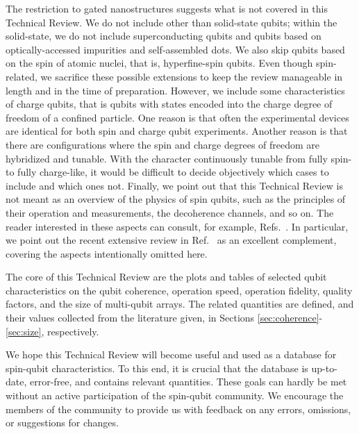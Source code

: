 \documentclass[aps, prx, showpacs, twocolumn, superscriptaddress, notitlepage, longbibliography, floatfix, nofootinbib]{revtex4-2}
\begin{document}
The restriction to gated nanostructures suggests what is not covered in this Technical Review. We do not include other than solid-state qubits; within the solid-state, we do not include superconducting qubits and qubits based on optically-accessed impurities and self-assembled dots. We also skip qubits based on the spin of atomic nuclei, that is, hyperfine-spin qubits. Even though spin-related, we sacrifice these possible extensions to keep the review manageable in length and in the time of preparation. However, we include some characteristics of charge qubits, that is qubits with states encoded into the charge degree of freedom of a confined particle. One reason is that often the experimental devices are identical for both spin and charge qubit experiments. Another reason is that there are configurations where the spin and charge degrees of freedom are hybridized and tunable. With the character continuously tunable from fully spin- to fully charge-like, it would be difficult to decide objectively which cases to include and which ones not. Finally, we point out that this Technical Review is not meant as an overview of the physics of spin qubits, such as the principles of their operation and measurements, the decoherence channels, and so on. The reader interested in these aspects can consult, for example, Refs.~\cite{oosterkamp_photon_1999, van_der_wiel_electron_2002, schliemann_electron_2003, hanson_spins_2007, kloeffel_prospects_2013, schreiber_quantum_2014, tahan_opinion_2021, chatterjee_semiconductor_2021, gonzalez-zalba_scaling_2021, scappucci_germanium_2021, oiwa_conversion_2017, vandersypen_quantum_2019, kuemmeth_roadmap_2020, chatterjee_semiconductor_2021}. In particular, we point out the recent extensive review in Ref.~\cite{burkard_semiconductor_2021} as an excellent complement, covering the aspects intentionally omitted here.


The core of this Technical Review are the plots and tables of selected qubit characteristics on the qubit coherence, operation speed, operation fidelity, quality factors, and the size of multi-qubit arrays. The related quantities are defined, and their values collected from the literature given, in Sections \ref{sec:coherence}-\ref{sec:size}, respectively.


We hope this Technical Review will become useful and used as a database for spin-qubit characteristics. To this end, it is crucial that the database is up-to-date, error-free, and contains relevant quantities. These goals can hardly be met without an active participation of the spin-qubit community. We encourage the members of the community to provide us with feedback on any errors, omissions, or suggestions for changes.
\end{document}
